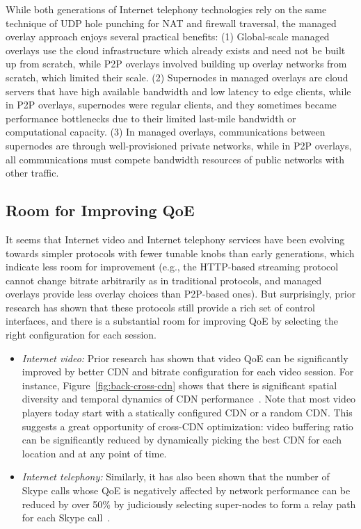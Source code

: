 While both generations of Internet telephony technologies rely on
the same technique of UDP hole punching for NAT and firewall traversal, 
the managed overlay approach enjoys several practical benefits:
(1) Global-scale managed overlays use the cloud infrastructure
which already exists and need not be built up from scratch, while 
P2P overlays involved building up overlay networks from
scratch, which limited their scale.
(2) Supernodes in managed overlays are cloud servers
that have high available bandwidth and low latency to edge clients, 
while in P2P overlays, supernodes were regular clients, 
and they sometimes became performance 
bottlenecks due to their limited last-mile bandwidth or computational capacity.
(3) In managed overlays, communications between supernodes are
through well-provisioned private networks, while in P2P overlays, all 
communications must compete bandwidth resources of public networks with
other traffic.


\subsection{Room for Improving QoE}
\label{subsec:related:back:room}

It seems that Internet video and Internet telephony services 
have been evolving towards simpler protocols with fewer 
tunable knobs than early generations, which indicate less
room for improvement (e.g., the HTTP-based streaming protocol cannot 
change bitrate arbitrarily as in traditional protocols, and 
managed overlays provide less overlay choices than 
P2P-based ones).
But surprisingly, prior research has shown
that these protocols still provide a rich set of control 
interfaces, and there is a substantial room for improving
QoE by selecting the right configuration for each
session.

\begin{itemize}

\item{\em Internet video:} 
Prior research has shown that video QoE can be significantly improved
by better CDN and bitrate configuration for
each video session.
For instance, Figure~\ref{fig:back-cross-cdn} shows that there is 
significant spatial diversity and temporal dynamics of CDN 
performance~\cite{sigcomm12conviva}.
Note that most video players today start with a statically configured 
CDN or a random CDN. This suggests a 
great opportunity of cross-CDN optimization:
video buffering ratio can be significantly reduced by dynamically
picking the best CDN for each location and at any point of time.

\item{\em Internet telephony:}
Similarly, it has also been shown that the number of Skype 
calls whose QoE is negatively affected by network performance
can be reduced by over 50\% by judiciously selecting super-nodes
to form a relay path for each Skype call~\cite{via}.


\end{itemize}

